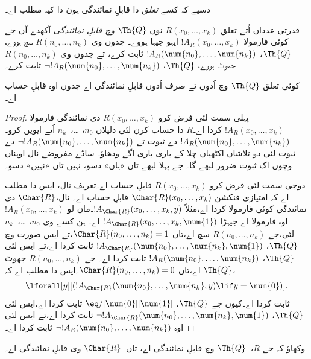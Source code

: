 \documentclass[../../../include/open-logic-section]{subfiles}
\begin{document}


دسیے کہ کسے \emph{تعلق} دا قابلِ نمائندگی ہون دا کیہ مطلب اے۔

\begin{defn}
 قدرتی عدداں اُتے تعلق $R(x_0,\dots,x_k)$ نوں
{\em $\Th{Q}$ وچ قابلِ نمائندگی} آکھدے آں جے کوئی فارمولا
$!A_R(x_0,\dots,x_k)$ ایہو جیہا ہووے۔ جدوں وی $R(n_0,\dots,n_k)$
سچ ہووے، $\Th{Q}$، $!A_R(\num{n_0},\dots,\num{n_k})$ ثابت
کرے، تے جدوں وی $R(n_0,\dots,n_k)$ جھوٹ ہووے، $\Th{Q}$،
$\lnot !A_R(\num{n_0}, \dots, \num{n_k})$ ثابت کرے۔
\end{defn}

\begin{thm}
 کوئی تعلق $\Th{Q}$ وچ اُدوں تے صرف اُدوں قابلِ نمائندگی اے
جدوں اوہ قابلِ حساب اے۔
\end{thm}

\begin{proof}
پہلی سمت لئی فرض کرو $R(x_0,\dots,x_k)$ دی
نمائندگی فارمولا $!A_R(x_0,\dots,x_k)$ کردا اے۔$R$ دا حساب کرن لئی دلیلاں $n_0$، \dots،~$n_k$ اُتے ایویں کرو۔
$!A_R(\num{n_0}, \dots, \num{n_k})$ دے ثبوت تے
$\lnot !A_R(\num{n_0}, \dots, \num{n_k})$ دے ثبوت لئی دو تلاشاں اکٹھیاں چلا کے باری باری اگے ودھاؤ۔
ساڈے مفروضے نال اوہناں وچوں اک ثبوت ضرور لبھے گا۔ جے پہلا
لبھے تاں «ہاں» دسو، نہیں تاں «نہیں» دسو۔

دوجی سمت لئی فرض کرو $R(x_0, \dots, x_k)$ قابلِ حساب اے۔تعریف نال،
ایس دا مطلب اے کہ امتیازی فنکشن $\Char{R}(x_0, \dots, x_k)$
قابلِ حساب اے۔ نال،$\Char{R}$
دی نمائندگی کوئی فارمولا کردا اے،مثلاً $!A_{\Char{R}}(x_0, \dots, x_k,
y)$۔مان لو $!A_R(x_0, \dots, x_k)$ اوہ فارمولا اے جیہڑا $!A_{\Char{R}}(x_0,
\dots, x_k, \num{1})$ اے۔ ہن کسے وی $n_0$، \dots،~$n_k$ لئی،جے $R(n_0,
\dots, n_k)$ سچ اے،تاں $\Char{R}(n_0, \dots, n_k) = 1$،تے ایس
صورت وچ $\Th{Q}$، $!A_{\Char{R}}(\num{n_0}, \dots, \num{n_k},
\num{1})$ ثابت کردا اے،تے ایس لئی $\Th{Q}$، $!A_R(\num{n_0}, \dots,
\num{n_k})$ ثابت کردا اے۔ جے $R(n_0, \dots, n_k)$ جھوٹ اے،تاں
$\Char{R}(n_0, \dots, n_k) = 0$۔ایس دا مطلب اے کہ $\Th{Q}$،
\[
\lforall[y][(!A_{\Char{R}}(\num{n_0}, \dots, \num{n_k}, y) \lif y =
  \num{0})].
\]
ثابت کردا اے۔کیوں جے $\Th{Q}$، $\eq/[\num{0}][\num{1}]$ ثابت کردا اے،ایس لئی $\Th{Q}$،
$\lnot !A_{\Char{R}}(\num{n_0}, \dots, \num{n_k}, \num{1})$ ثابت کردا اے،تے ایس لئی
اوہ $\lnot !A_R(\num{n_0}, \dots, \num{n_k})$ ثابت کردا اے۔
\end{proof}

\begin{prob}
وکھاؤ کہ جے $R$،~$\Th{Q}$ وچ قابلِ نمائندگی اے، تاں~$\Char{R}$ وی قابلِ نمائندگی اے۔
\end{prob}
\end{document}
